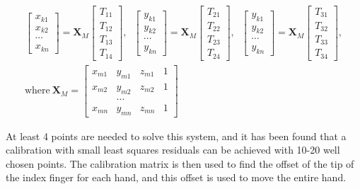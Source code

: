 \begin{gather*}
    \begin{bmatrix}
        x_{k1} \\
        x_{k2} \\
        \cdots \\
        x_{kn}
    \end{bmatrix}
    =
    \mathbf{X}_M
    \begin{bmatrix}
        T_{11} \\
        T_{12} \\
        T_{13} \\
        T_{14}
    \end{bmatrix}
    ,\;\;
    \begin{bmatrix}
        y_{k1} \\
        y_{k2} \\
        \cdots \\
        y_{kn}
    \end{bmatrix}
    =
    \mathbf{X}_M
    \begin{bmatrix}
        T_{21} \\
        T_{22} \\
        T_{23} \\
        T_{24}
    \end{bmatrix}
    ,\;\;
    \begin{bmatrix}
        y_{k1} \\
        y_{k2} \\
        \cdots \\
        y_{kn}
    \end{bmatrix}
    =
    \mathbf{X}_M
    \begin{bmatrix}
        T_{31} \\
        T_{32} \\
        T_{33} \\
        T_{34}
    \end{bmatrix}
    ,\\
    \text{where}~\mathbf{X}_M =
    \begin{bmatrix}
        x_{m1} & y_{m1} & z_{m1} & 1 \\
        x_{m2} & y_{m2} & z_{m2} & 1 \\
        &\dots & & \\
        x_{mn} & y_{mn} & z_{mn} & 1
    \end{bmatrix}
\end{gather*}

At least 4 points are needed to solve this system, and it has been found that a calibration with small least squares residuals can be achieved with 10-20 well chosen points.
The calibration matrix is then used to find the offset of the tip of the index finger for each hand, and this offset is used to move the entire hand.


